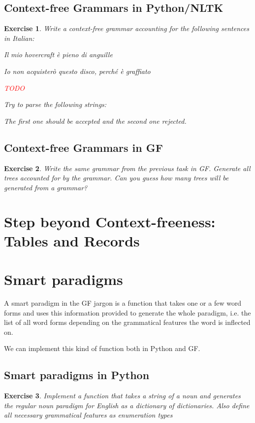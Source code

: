 \documentclass{scrartcl}
\newcommand{\note}[1]{\textcolor{red}{\uppercase{#1}}}
\newtheorem{exercise}{Exercise}
\begin{document}
\subsection{Context-free Grammars in Python/NLTK}



\begin{exercise}
  Write a context-free grammar accounting for the following sentences in Italian:

  Il mio hovercraft è pieno di anguille
  
  Io non acquisterò questo disco, perché è graffiato
  
\note{todo}

  Try to parse the following strings:

  
  
  The first one should be accepted and the second one rejected.

\end{exercise}
\subsection{Context-free Grammars in GF}



\begin{exercise}
  Write the same grammar from the previous task in GF. Generate all trees accounted for by the grammar. Can you guess how many trees will be
  generated from a grammar?
\end{exercise}
\section{Step beyond Context-freeness: Tables and Records}
\section{Smart paradigms}
A smart paradigm in the GF jargon is a function that takes one or a few word forms and uses this information provided to generate the whole paradigm, i.e. the list of all word forms depending on the grammatical features the word is inflected on.

We can implement this kind of function both in Python and GF.
\subsection{Smart paradigms in Python}
\begin{exercise}
  Implement a function that takes a string of a noun and generates the regular noun paradigm for English as a dictionary of dictionaries. Also define all necessary grammatical features as enumeration types
\end{exercise}
\end{document}
